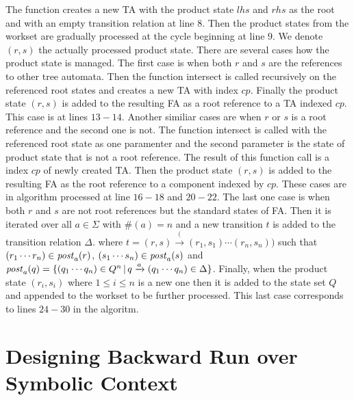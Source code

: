 The function creates a new TA with the product state $lhs$ and $rhs$ as the root
and with an empty transition relation at line $8$.
Then the product states from the workset are gradually processed at the cycle beginning
at line $9$.
We denote $(r,s)$ the actually processed product state.
There are several cases how the product state is managed.
The first case is when both $r$ and $s$ are the references to other
tree automata.
Then the function intersect is called recursively on the referenced
root states and creates a new TA with index $cp$.
Finally the product state $(r,s)$ is added to the resulting FA
as a root reference to a TA indexed $cp$.
This case is at lines $13-14$.
Another similiar cases are when $r$ or $s$ is a root reference and the second one is not.
The function intersect is called with the referenced root state as one paramenter
and the second parameter is the state of product state that is not a root reference.
The result of this function call is a index $cp$ of newly created TA.
Then the product state $(r,s)$ is added to the resulting FA as the root reference
to a component indexed by $cp$.
These cases are in algorithm processed at line $16-18$ and $20-22$.
The last one case is when both $r$ and $s$ are not root references
but the standard states of FA.
Then it is iterated over all $a \in \Sigma$ with $\#(a) = n$
and a new transition $t$ is added to the transition relation $\Delta$.
where $t = (r,s) \xrightarrow ((r_1,s_1) \cdots (r_n, s_n))$ such that
$(r_1 \cdots r_n) \in \mathit{post}_{a}(r)$, $(s_1 \cdots s_n) \in \mathit{post}_{a}(s)$ and
$\mathit{post}_{a}(q) = \{(q_1 \cdots q_n) \in Q^n\,|\, q \xrightarrow{a} (q_1 \cdots q_n) \in \Delta\}$.
Finally, when the product state $(r_i,s_i)$ where $1 \leq i \leq n$ is a new one
then it is added to the state set $Q$ and appended to the workset to be further processed.
This last case corresponds to lines $24-30$ in the algoritm.



\section{Designing Backward Run over Symbolic Context}

